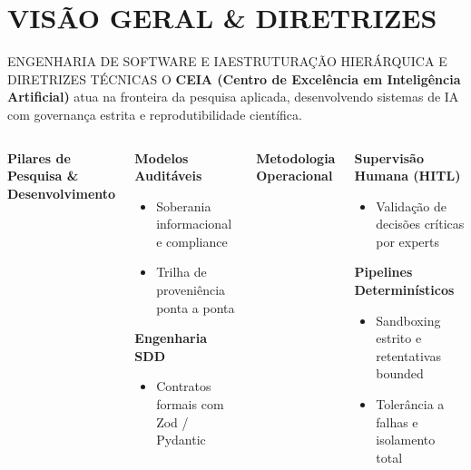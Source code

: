\documentclass[aspectratio=169,t,xcolor=table]{beamer}
\begin{document}
\section{VISÃO GERAL \& DIRETRIZES}
\begin{frame}{ENGENHARIA DE SOFTWARE E IA}{ESTRUTURAÇÃO HIERÁRQUICA E DIRETRIZES TÉCNICAS}
    \vspace{0.1em}
    O \textbf{CEIA (Centro de Excelência em Inteligência Artificial)} atua na fronteira da pesquisa aplicada, desenvolvendo sistemas de IA com governança estrita e reprodutibilidade científica.
    \vspace{0.25em}

    \begin{columns}[T]
        {\small\bfseries\color{CEIADarkBlue} Pilares de Pesquisa \& Desenvolvimento}\par\vspace{0.15em}
        \begin{ceiaitemize}
            \item \textbf{Modelos Auditáveis}
            \begin{itemize}
                \item Soberania informacional e compliance
                \item Trilha de proveniência ponta a ponta
            \end{itemize}
            \item \textbf{Engenharia SDD}
            \begin{itemize}
                \item Contratos formais com Zod / Pydantic
            \end{itemize}
        \end{ceiaitemize}

        {\small\bfseries\color{CEIADarkBlue} Metodologia Operacional}\par\vspace{0.15em}
        \begin{ceiaitemize}
            \item \textbf{Supervisão Humana (HITL)}
            \begin{itemize}
                \item Validação de decisões críticas por experts
            \end{itemize}
            \item \textbf{Pipelines Determinísticos}
            \begin{itemize}
                \item Sandboxing estrito e retentativas bounded
                \item Tolerância a falhas e isolamento total
            \end{itemize}
        \end{ceiaitemize}
    \end{columns}
\end{frame}
\end{document}
